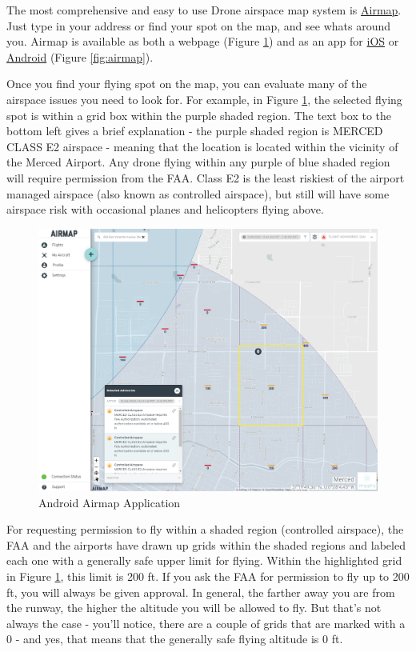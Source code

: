 \documentclass[
]{book}
\begin{document}
The most comprehensive and easy to use Drone airspace map system is \href{https://app.airmap.com/}{Airmap}. Just type in your address or find your spot on the map, and see whats around you. Airmap is available as both a webpage (Figure \ref{fig:airmap-web}) and as an app for \href{https://apps.apple.com/us/app/airmap-for-drones/id1042824733}{iOS} or \href{https://play.google.com/store/apps/details?id=com.airmap.airmap\&hl=en_US}{Android} (Figure \ref{fig:airmap}).

Once you find your flying spot on the map, you can evaluate many of the airspace issues you need to look for. For example, in Figure \ref{fig:airmap-web}, the selected flying spot is within a grid box within the purple shaded region.
The text box to the bottom left gives a brief explanation - the purple shaded region is MERCED CLASS E2 airspace - meaning that the location is located within the vicinity of the Merced Airport. Any drone flying within any purple of blue shaded region will require permission from the FAA. Class E2 is the least riskiest of the airport managed airspace (also known as controlled airspace), but still will have some airspace risk with occasional planes and helicopters flying above.

\begin{figure}

{\centering \includegraphics[width=0.85\linewidth]{images/Airmap-webpage} 

}

\caption{Android Airmap Application}\label{fig:airmap-web}
\end{figure}

For requesting permission to fly within a shaded region (controlled airspace), the FAA and the airports have drawn up grids within the shaded regions and labeled each one with a generally safe upper limit for flying. Within the highlighted grid in Figure \ref{fig:airmap-web}, this limit is 200 ft. If you ask the FAA for permission to fly up to 200 ft, you will always be given approval. In general, the farther away you are from the runway, the higher the altitude you will be allowed to fly. But that's not always the case - you'll notice, there are a couple of grids that are marked with a 0 - and yes, that means that the generally safe flying altitude is 0 ft.
\end{document}

